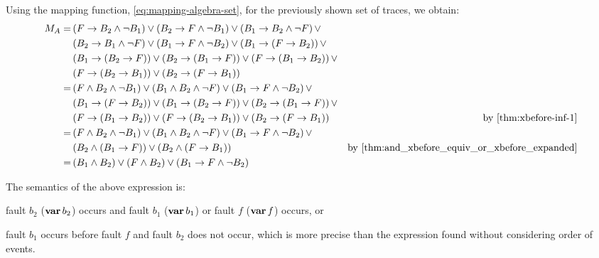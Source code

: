Using the mapping function, \cref{eq:mapping-algebra-set}, for the previously shown set of traces, we obtain:
%
\begin{align}
M_A = & 
  \left(\xbefore{F}{B_2} \land \lnot B_1\right) \lor
  \left(\xbefore{B_2}{F} \land \lnot B_1\right) \lor
  \left(\xbefore{B_1}{B_2} \land \lnot F\right) \lor \nonumber \\
  & \left(\xbefore{B_2}{B_1} \land \lnot F\right) \lor
  \left(\xbefore{B_1}{F} \land \lnot B_2\right) \lor
  \left(\xbefore{B_1}{\left(\xbefore{F}{B_2}\right)}\right) \lor \nonumber \\
  &\left(\xbefore{B_1}{\left(\xbefore{B_2}{F}\right)}\right) \lor
  \left(\xbefore{B_2}{\left(\xbefore{B_1}{F}\right)}\right) \lor
  \left(\xbefore{F}{\left(\xbefore{B_1}{B_2}\right)}\right) \lor \nonumber \\
  &\left(\xbefore{F}{\left(\xbefore{B_2}{B_1}\right)}\right) \lor
  \left(\xbefore{B_2}{\left(\xbefore{F}{B_1}\right)}\right) \nonumber \\
%
  = & \left(F \land B_2 \land \lnot B_1\right) \lor 
  \left(B_1 \land B_2 \land \lnot F\right) \lor
  \left(\xbefore{B_1}{F} \land \lnot B_2\right) \lor \nonumber \\
  & \left(\xbefore{B_1}{\left(\xbefore{F}{B_2}\right)}\right) \lor 
  \left(\xbefore{B_1}{\left(\xbefore{B_2}{F}\right)}\right) \lor
  \left(\xbefore{B_2}{\left(\xbefore{B_1}{F}\right)}\right) \lor \nonumber \\
  & \left(\xbefore{F}{\left(\xbefore{B_1}{B_2}\right)}\right) \lor 
  \left(\xbefore{F}{\left(\xbefore{B_2}{B_1}\right)}\right) \lor
  \left(\xbefore{B_2}{\left(\xbefore{F}{B_1}\right)}\right) 
  & \text{by \cref{thm:xbefore-inf-1}} \nonumber \\
%
  = & \left(F \land B_2 \land \lnot B_1\right) \lor 
  \left(B_1 \land B_2 \land \lnot F\right) \lor
  \left(\xbefore{B_1}{F} \land \lnot B_2\right) \lor \nonumber \\
  & \left(B_2 \land \left(\xbefore{B_1}{F}\right)\right) \lor
  \left(B_2 \land \left(\xbefore{F}{B_1}\right)\right)
  & \text{by \cref{thm:and_xbefore_equiv_or_xbefore_expanded}} \nonumber \\
%
  = &\left(B_1 \land B_2\right) \lor \left(F \land B_2\right) \lor
    \left(\xbefore{B_1}{F} \land \lnot B_2\right) \label{eq:m-algebra}
\end{align}

The semantics of the above expression is:
\begin{alineasinline}
  \item fault $b_2$ ($\operatorname{\mathbf{var}} b_2$) occurs and fault $b_1$ ($\operatorname{\mathbf{var}} b_1$) or fault $f$ ($\operatorname{\mathbf{var}} f$) occurs, or
  \item fault $b_1$ occurs before fault $f$ and fault $b_2$ does not occur, which is more precise than the expression found without considering order of events.
\end{alineasinline}

